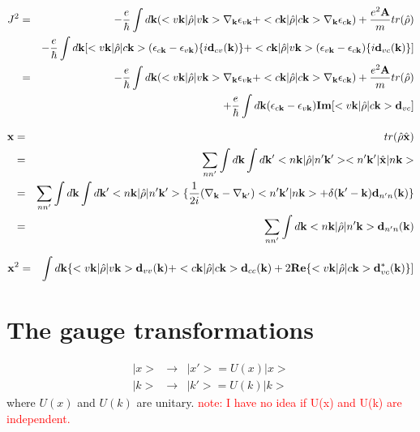 \documentclass[aps,prb,preprint]{revtex4-1}
\begin{document}
\begin{appendix}
\begin{eqnarray}
J^{2} &=&  -\frac{e}{\hbar} \int d{\bf k} (<v{\bf k}|\hat{\rho}|v{\bf k}> \nabla_{\bf k} \epsilon_{v{\bf k}} +<c{\bf k}|\hat{\rho}|c{\bf k}> \nabla_{\bf k} \epsilon_{c{\bf k}} ) + \frac{e^2{\bf A}}{m}tr(\hat{\rho}) \nonumber \\
&& -\frac{e}{\hbar} \int d{\bf k} [ <v{\bf k}|\hat{\rho}|c{\bf k}> (\epsilon_{c{\bf k}}-\epsilon_{v{\bf k}}) \{i {\bf d}_{cv}({\bf k})\} + <c{\bf k}|\hat{\rho}|v{\bf k}> (\epsilon_{v{\bf k}}-\epsilon_{c{\bf k}}) \{i {\bf d}_{vc}({\bf k})\} ]  \nonumber \\
&=&  -\frac{e}{\hbar} \int d{\bf k} (<v{\bf k}|\hat{\rho}|v{\bf k}> \nabla_{\bf k} \epsilon_{v{\bf k}} +<c{\bf k}|\hat{\rho}|c{\bf k}> \nabla_{\bf k} \epsilon_{c{\bf k}} ) + \frac{e^2{\bf A}}{m}tr(\hat{\rho}) \nonumber \\
&& + \frac{e}{\hbar} \int d{\bf k} (\epsilon_{c{\bf k}}-\epsilon_{v{\bf k}}) {\bf Im}[ <v{\bf k}|\hat{\rho}|c{\bf k}>{\bf d}_{vc} ]  
\end{eqnarray} 

\begin{eqnarray}
{\bf x} &=&  tr(\hat{\rho}\hat{\bf x}) \nonumber \\
&=&  \sum_{nn'} \int d{\bf k} \int d{\bf k'} <n{\bf k}|\hat{\rho}|n'{\bf k'}><n'{\bf k'}|\hat{\bf x}|n{\bf k}> \nonumber \\
&=&  \sum_{nn'} \int d{\bf k} \int d{\bf k'} <n{\bf k}|\hat{\rho}|n'{\bf k'}>\{ \frac{1}{2i}(\nabla_{\bf k}-\nabla_{\bf k'}) <n'{\bf k'}|n{\bf k}> + \delta({\bf k'-k}) {\bf d}_{n'n}({\bf k})\} \nonumber \\
&=& \sum_{nn'} \int d{\bf k} <n{\bf k}|\hat{\rho}|n'{\bf k}> {\bf d}_{n'n}({\bf k})
\end{eqnarray} 

\begin{eqnarray}
{\bf x}^2 &=& \int d{\bf k} \{<v{\bf k}|\hat{\rho}|v{\bf k}> {\bf d}_{vv}({\bf k}) + <c{\bf k}|\hat{\rho}|c{\bf k}> {\bf d}_{cc}({\bf k}) + 2{\bf Re} \{ <v{\bf k}|\hat{\rho}|c{\bf k}> {\bf d}_{vc}^*({\bf k}) \}]
\end{eqnarray} 


\section{The gauge transformations}
\begin{eqnarray}
|x> &\rightarrow& |x'> = U(x) |x> \\
|k> &\rightarrow& |k'> = U(k) |k>
\end{eqnarray} 
where $U(x)$ and $U(k)$ are unitary.
\textcolor{red}{note: I have no idea if U(x) and U(k) are independent. }


\end{appendix}
\end{document}
